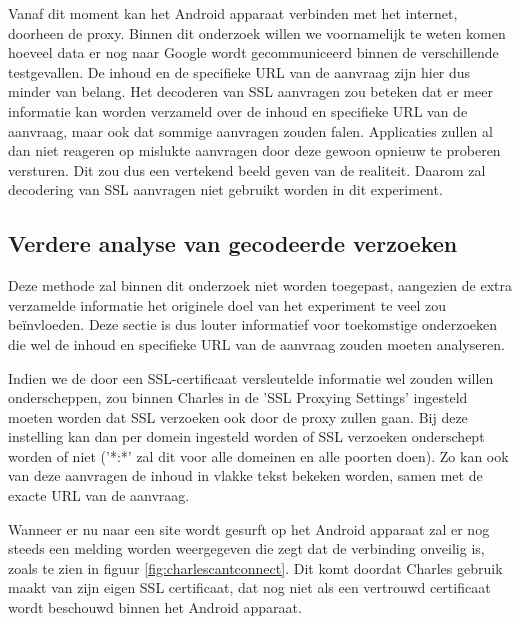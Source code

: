 Vanaf dit moment kan het Android apparaat verbinden met het internet, doorheen de proxy. Binnen dit onderzoek willen we voornamelijk te weten komen hoeveel data er nog naar Google wordt gecommuniceerd binnen de verschillende testgevallen. De inhoud en de specifieke URL van de aanvraag zijn hier dus minder van belang. Het decoderen van SSL aanvragen zou beteken dat er meer informatie kan worden verzameld over de inhoud en specifieke URL van de aanvraag, maar ook dat sommige aanvragen zouden falen. Applicaties zullen al dan niet reageren op mislukte aanvragen door deze gewoon opnieuw te proberen versturen. Dit zou dus een vertekend beeld geven van de realiteit. Daarom zal decodering van SSL aanvragen niet gebruikt worden in dit experiment. 

\subsection{Verdere analyse van gecodeerde verzoeken}
\label{subsec:decodessl}
Deze methode zal binnen dit onderzoek niet worden toegepast, aangezien de extra verzamelde informatie het originele doel van het experiment te veel zou beïnvloeden. Deze sectie is dus louter informatief voor toekomstige onderzoeken die wel de inhoud en specifieke URL van de aanvraag zouden moeten analyseren.

Indien we de door een SSL-certificaat versleutelde informatie wel zouden willen onderscheppen, zou binnen Charles in de 'SSL Proxying Settings' ingesteld moeten worden dat SSL verzoeken ook door de proxy zullen gaan. Bij deze instelling kan dan per domein ingesteld worden of SSL verzoeken onderschept worden of niet ('*:*' zal dit voor alle domeinen en alle poorten doen). Zo kan ook van deze aanvragen de inhoud in vlakke tekst bekeken worden, samen met de exacte URL van de aanvraag. 

Wanneer er nu naar een site wordt gesurft op het Android apparaat zal er nog steeds een melding worden weergegeven die zegt dat de verbinding onveilig is, zoals te zien in figuur \ref{fig:charlescantconnect}. Dit komt doordat Charles gebruik maakt van zijn eigen SSL certificaat, dat nog niet als een vertrouwd certificaat wordt beschouwd binnen het Android apparaat.

